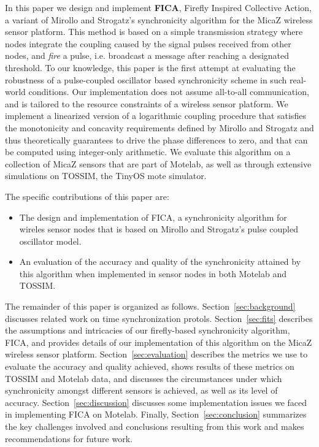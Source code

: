 In this paper we design and implement {\bf FICA}, Firefly Inspired Collective Action,
a variant of Mirollo and Strogatz's synchronicity algorithm for the MicaZ 
wireless sensor platform. 
This method is based on a simple transmission strategy where nodes
integrate the coupling caused by the signal pulses received from other nodes,
and \emph{fire} a pulse, i.e. broadcast a message after reaching a designated threshold.
To our knowledge, this paper is the first attempt at evaluating the 
robustness of a pulse-coupled oscillator based synchronicity scheme in such 
real-world conditions.
Our implementation does not assume
all-to-all communication, and is tailored to the resource constraints of a wireless sensor
platform. 
We implement a linearized version of a logarithmic coupling procedure that satisfies 
the monotonicity and concavity requirements defined by Mirollo and Strogatz 
and thus theoretically guarantees to drive the phase differences to zero, and 
that can be computed using integer-only arithmetic.
We evaluate this algorithm on a collection of MicaZ sensors that are part of 
Motelab, as well as through extensive simulations on TOSSIM, the TinyOS mote simulator.


The specific contributions of this paper are:
\begin{itemize}\addtolength{\itemsep}{-0.5\baselineskip}
\item The design and implementation of FICA, a synchronicity algorithm for wireles sensor nodes that is based on Mirollo and Strogatz's pulse coupled oscillator model.
\item An evaluation of the accuracy and quality of the synchronicity attained by this algorithm when implemented in sensor nodes in both Motelab and TOSSIM.
\end{itemize}

The remainder of this paper is organized as follows. Section~\ref{sec:background} discusses
related work on time synchronization protols. Section~\ref{sec:fits} describes the
assumptions and intricacies of our firefly-based synchronicity algorithm, FICA,
and provides details of our implementation of this algorithm on the MicaZ 
wireless sensor platform. Section~\ref{sec:evaluation} describes the metrics we
use to evaluate the accuracy and quality achieved, shows results
of these metrics on TOSSIM and Motelab data, and discusses the circumstances
under which synchronicity amongst different sensors is achieved, as well as its
level of accuracy.  Section~\ref{sec:discussion} discusses some implementation
issues we faced in implementing FICA on Motelab.
Finally, Section~\ref{sec:conclusion} summarizes the key 
challenges involved and conclusions resulting from this work and makes
recommendations for future work.
 